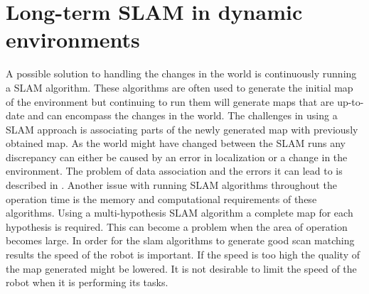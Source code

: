 \section{Long-term SLAM in dynamic environments}
A possible solution to handling the changes in the world is continuously running a SLAM algorithm. 
These algorithms are often used to generate the initial map of the environment but continuing to run them will generate maps that are up-to-date and can encompass the changes in the world. The challenges in using a SLAM approach is associating parts of the newly generated map with previously obtained map. 
As the world might have changed between the SLAM runs any discrepancy can either be caused by an error in localization or a change in the environment. 
The problem of data association and the errors it can lead to is described in \cite{tipaldi2013lifelong}. 
Another issue with running SLAM algorithms throughout the operation time is the memory and computational requirements of these algorithms. Using a multi-hypothesis SLAM algorithm a complete map for each hypothesis is required. This can become a problem when the area of operation becomes large. 
In order for the slam algorithms to generate good scan matching results the speed of the robot is important. If the speed is too high the quality of the map generated might be lowered. It is not desirable to limit the speed of the robot when it is performing its tasks. 

